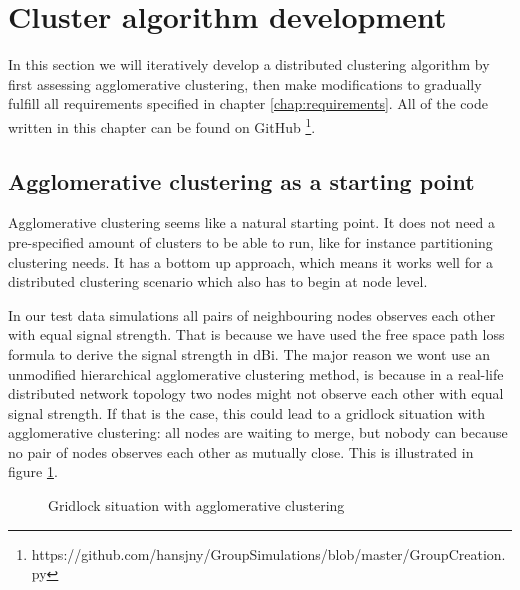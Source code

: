 \section{Cluster algorithm development}
In this section we will iteratively develop a distributed clustering algorithm by first assessing agglomerative clustering, then make modifications to 
gradually fulfill all requirements specified in chapter \ref{chap:requirements}. All of the code written in this chapter can be found on GitHub \footnote{https://github.com/hansjny/GroupSimulations/blob/master/GroupCreation.py}.

\subsection{Agglomerative clustering as a starting point}
Agglomerative clustering seems like a natural starting point. It does not need a pre-specified amount of clusters to be able to run,
like for instance partitioning clustering needs. It has a bottom up approach, which means it works well for a distributed clustering scenario which also has to begin
at node level. 

In our test data simulations all pairs of neighbouring nodes observes each other with equal signal strength. That is because we have used the free space path loss formula to derive
the signal strength in dBi. The major reason we wont use an unmodified hierarchical agglomerative clustering method,  is because in a real-life distributed network topology two nodes might not observe
each other with equal signal strength. If that is the case, this could lead to a gridlock situation with agglomerative clustering: all nodes are waiting to merge, but nobody can because no pair 
of nodes observes each other as mutually close. This is illustrated in figure \ref{fig:gridlock}. 

\begin{figure}
	\centering
	\caption{Gridlock situation with agglomerative clustering}
	\label{fig:gridlock}
\end{figure}


